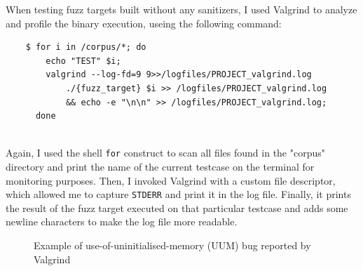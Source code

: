 \newpage
When testing fuzz targets built without any sanitizers, I used Valgrind to analyze and profile the binary execution, useing the following command:
\begin{verbatim}
    $ for i in /corpus/*; do 
        echo "TEST" $i; 
        valgrind --log-fd=9 9>>/logfiles/PROJECT_valgrind.log 
            ./{fuzz_target} $i >> /logfiles/PROJECT_valgrind.log 
            && echo -e "\n\n" >> /logfiles/PROJECT_valgrind.log; 
      done
\end{verbatim}
\ \\
Again, I used the shell \verb|for| construct to scan all files found in the "corpus" directory and print the name of the current testcase on the terminal for monitoring purposes.
\newline
Then, I invoked Valgrind with a custom file descriptor, which allowed me to capture \verb|STDERR| and print it in the log file.
\newline
Finally, it prints the result of the fuzz target executed on that particular testcase and adds some newline characters to make the log file more readable.\newline
\begin{figure}[h]
\caption{Example of use-of-uninitialised-memory (UUM) bug reported by Valgrind}
\label{fig:valgrind_example}
\end{figure}
\ \\




